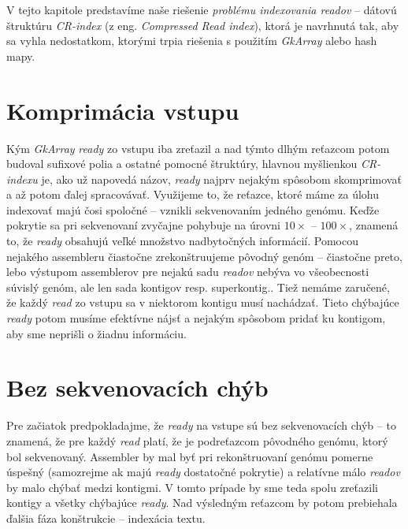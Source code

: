 V tejto kapitole predstavíme naše riešenie \emph{problému indexovania readov} -- dátovú štruktúru \emph{CR-index} (z eng. \emph{Compressed Read index}), ktorá je navrhnutá tak, aby sa vyhla nedostatkom, ktorými trpia riešenia s použitím \emph{GkArray} alebo hash mapy.


\section{Komprimácia vstupu}
Kým \emph{GkArray} \emph{ready} zo vstupu iba zreťazil a nad týmto dlhým reťazcom potom budoval sufixové polia a ostatné pomocné štruktúry, hlavnou myšlienkou \emph{CR-indexu} je, ako už napovedá názov, \emph{ready} najprv nejakým spôsobom skomprimovať a až potom ďalej spracovávať. Využijeme to, že reťazce, ktoré máme za úlohu indexovať majú čosi spoločné -- vznikli sekvenovaním jedného genómu. Keďže pokrytie sa pri sekvenovaní zvyčajne pohybuje na úrovni $10\times$ -- $100\times$, znamená to, že \emph{ready} obsahujú veľké množstvo nadbytočných informácií. Pomocou nejakého assembleru čiastočne zrekonštruujeme pôvodný genóm  -- čiastočne preto, lebo výstupom assemblerov pre nejakú sadu \emph{readov} nebýva vo všeobecnosti súvislý genóm, ale len sada kontigov resp. superkontig.. Tiež nemáme zaručené, že každý \emph{read} zo vstupu sa v niektorom kontigu musí nachádzať. Tieto chýbajúce \emph{ready} potom musíme efektívne nájsť a nejakým spôsobom pridať ku kontigom, aby sme neprišli o žiadnu informáciu.

\section{Bez sekvenovacích chýb}
Pre začiatok predpokladajme, že \emph{ready} na vstupe sú bez sekvenovacích chýb -- to znamená, že pre každý \emph{read} platí, že je podreťazcom pôvodného genómu, ktorý bol sekvenovaný. Assembler by mal byť pri rekonštruovaní genómu pomerne úspešný (samozrejme ak majú \emph{ready} dostatočné pokrytie) a relatívne málo \emph{readov} by malo chýbať medzi kontigmi. V tomto prípade by sme teda spolu zreťazili kontigy a všetky chýbajúce \emph{ready}. Nad výsledným reťazcom by potom prebiehala ďalšia fáza konštrukcie -- indexácia textu.

